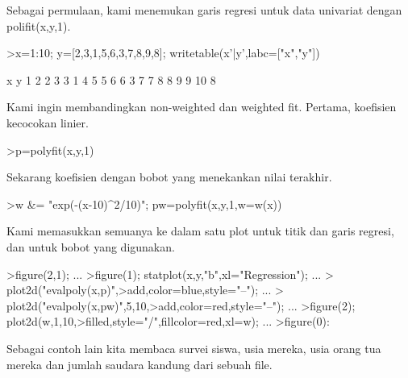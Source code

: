 \documentclass{article}
\begin{document}
\begin{eulernotebook}
\begin{eulercomment}
\begin{eulercomment}
\begin{eulercomment}
Sebagai permulaan, kami menemukan garis regresi untuk data univariat
dengan polifit(x,y,1).
\end{eulercomment}
\begin{eulerprompt}
>x=1:10; y=[2,3,1,5,6,3,7,8,9,8]; writetable(x'|y',labc=["x","y"])
\end{eulerprompt}
\begin{euleroutput}
           x         y
           1         2
           2         3
           3         1
           4         5
           5         6
           6         3
           7         7
           8         8
           9         9
          10         8
\end{euleroutput}
\begin{eulercomment}
Kami ingin membandingkan non-weighted dan weighted fit. Pertama,
koefisien kecocokan linier.
\end{eulercomment}
\begin{eulerprompt}
>p=polyfit(x,y,1)
\end{eulerprompt}
\begin{euleroutput}
  [0.733333,  0.812121]
\end{euleroutput}
\begin{eulercomment}
Sekarang koefisien dengan bobot yang menekankan nilai terakhir.
\end{eulercomment}
\begin{eulerprompt}
>w &= "exp(-(x-10)^2/10)"; pw=polyfit(x,y,1,w=w(x))
\end{eulerprompt}
\begin{euleroutput}
  [4.71566,  0.38319]
\end{euleroutput}
\begin{eulercomment}
Kami memasukkan semuanya ke dalam satu plot untuk titik dan garis
regresi, dan untuk bobot yang digunakan.
\end{eulercomment}
\begin{eulerprompt}
>figure(2,1);  ...
>figure(1); statplot(x,y,"b",xl="Regression"); ...
>  plot2d("evalpoly(x,p)",>add,color=blue,style="--"); ...
>  plot2d("evalpoly(x,pw)",5,10,>add,color=red,style="--"); ...
>figure(2); plot2d(w,1,10,>filled,style="/",fillcolor=red,xl=w); ...
>figure(0):
\end{eulerprompt}
\begin{eulercomment}
Sebagai contoh lain kita membaca survei siswa, usia mereka, usia orang
tua mereka dan jumlah saudara kandung dari sebuah file.


\end{eulercomment}
\end{eulercomment}
\end{eulercomment}
\end{eulernotebook}
\end{document}
